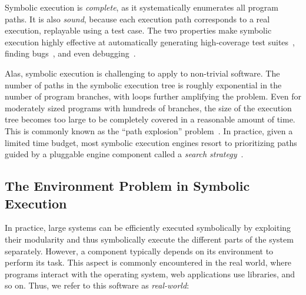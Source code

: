 Symbolic execution is \emph{complete}, as it systematically enumerates all program paths.
%
It is also \emph{sound}, because each execution path corresponds to a real execution, replayable using a test case.
%
The two properties make symbolic execution highly effective at automatically generating high-coverage test suites~\cite{klee}, finding bugs~\cite{sage2012,mayhem}, and even debugging~\cite{esd,oasis,portend,king:symbolic:2}.



Alas, symbolic execution is challenging to apply to non-trivial software.
%
The number of paths in the symbolic execution tree is roughly exponential in the number of program branches, with loops further amplifying the problem.  Even for moderately sized programs with hundreds of branches, the size of the execution tree becomes too large to be completely covered in a reasonable amount of time.
%
This is commonly known as the ``path explosion'' problem~\cite{burnim2008heuristics,klee,godefroid:compdyntest,rwset,state-merging}.
%
In practice, given a limited time budget, most symbolic execution engines resort to prioritizing paths guided by a pluggable engine component called a \emph{search strategy}~\cite{burnim2008heuristics,hct,dart,klee,godefroid:fuzz}.


\subsection{The Environment Problem in Symbolic Execution}

In practice, large systems can be efficiently executed symbolically by exploiting their modularity and thus symbolically execute the different parts of the system separately.
%
However, a component typically depends on its environment to perform its task.
%
This aspect is commonly encountered in the real world, where programs interact with the operating system, web applications use libraries, and so on.  Thus, we refer to this software as \emph{real-world}:

